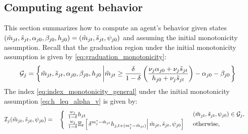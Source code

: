 \subsection{Computing agent behavior}\label{sec:computing}

This section summarizes how to compute an agent's behavior given states $(\tilde{m}_{jt}, \tilde{s}_{jt}, \alpha_{j0}, \beta_{j0}, h_{j0}) = (\tilde{m}_{jt}, \tilde{s}_{jt}, \psi_{j0})$ and assuming the initial monotonicity assumption. 
Recall that the graduation region under the initial monotonicity assumption is given by \eqref{eq:graduation_monotonicity}: 
\begin{equation*}
     \mathcal{G}_j = 
     \left\{ \tilde{m}_{jt}, \tilde{s}_{jt}, \alpha_{j0}, \beta_{j0}, h_{j0} \left\vert
     \tilde{m}_{jt} \geq \frac{\delta}{1 - \delta}
    \left( 
        \frac{\nu_j \alpha_{j0} + \nu_j \tilde{s}_{jt}}{h_{j0} + \nu_j \tilde{s}_{jt}}
     \right) - \alpha_{j0} - \beta_{j0}
     \right. \right\}
 \end{equation*} 
The index \eqref{eq:index_monotonicity_general} under the initial monotonicity assumption \eqref{eq:h_leq_alpha_v} is given by:
\begin{alignat*}{4}
    \label{eq:index_monotonicity}
    &\mathcal{I}_j (\tilde{m}_{jt}, \tilde{s}_{jt}, \psi_{j0})
    =&&
    \begin{cases}
    \begin{array}{l}
    \frac{w_j}{1 - \delta} 
    h_{jt}
    \end{array}
    &(\tilde{m}_{jt}, \tilde{s}_{jt}, \psi_{j0}) \in \mathcal{G}_j,
    \\
    \begin{array}{l}
    \frac{w_j}{1 - \delta} 
    \mathbb{E}_t \left[\left. 
        \delta^{m_j^* - \tilde{m}_{jt}}
        h_{j,t + (m_j^* - \tilde{m}_{jt})}
     \right\vert \tilde{m}_{jt}, \tilde{s}_{jt}, \psi_{j0} \right]
    \end{array}
    &\text{otherwise,}
    \end{cases} 
\end{alignat*}


